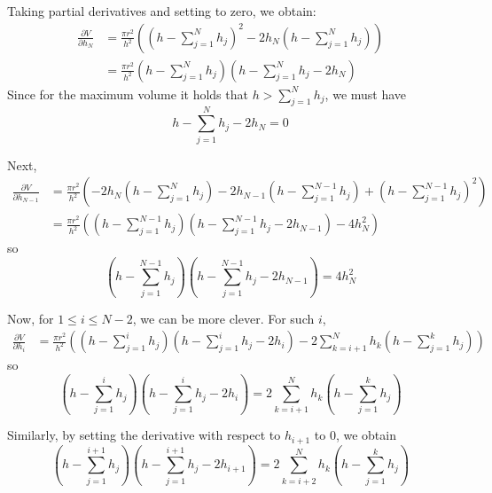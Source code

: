 \documentclass[12pt]{article}
\begin{document}
Taking partial derivatives and setting to zero, we obtain:
\begin{align*}
  \frac{\partial V}{\partial h_N} &= \frac{\pi r^2}{h^2} \left( \left( h - \sum_{j=1}^N h_j \right)^2 - 2h_N \left( h - \sum_{j=1}^N h_j \right) \right) \\
  &= \frac{\pi r^2}{h^2} \left( h - \sum_{j=1}^N h_j \right) \left( h - \sum_{j=1}^N h_j - 2h_N \right)
\end{align*}
Since for the maximum volume it holds that $h > \sum_{j=1}^N h_j$, we must have
\begin{equation}
  \label{eq:5}
  h - \sum_{j=1}^N h_j - 2h_N = 0
\end{equation}

Next,
\begin{align*}
  \frac{\partial V}{\partial h_{N-1}} &= \frac{\pi r^2}{h^2} \left( -2h_N\left(h - \sum_{j=1}^N h_j\right) - 2h_{N-1}\left( h - \sum_{j=1}^{N-1}h_j \right) + \left( h - \sum_{j=1}^{N-1}h_j \right)^2 \right) \\
  &= \frac{\pi r^2}{h^2}\left( \left( h - \sum_{j=1}^{N-1}h_j \right) \left( h - \sum_{j=1}^{N-1}h_j - 2h_{N-1} \right) - 4h_N^2 \right)
\end{align*}
so
\begin{equation}
  \label{eq:6}
  \left( h - \sum_{j=1}^{N-1}h_j \right) \left( h - \sum_{j=1}^{N-1}h_j - 2h_{N-1} \right) = 4h_N^2
\end{equation}

Now, for $1 \leq i \leq N - 2$, we can be more clever. For such $i$,
\begin{align*}
  \frac{\partial V}{\partial h_i} &= \frac{\pi r^2}{h^2} \left( \left( h - \sum_{j=1}^i h_j \right) \left( h - \sum_{j=1}^i h_j - 2h_i \right) - 2 \sum_{k=i+1}^N h_k \left( h - \sum_{j=1}^k h_j\right) \right)
\end{align*}
so
\begin{equation}
  \label{eq:7}
  \left( h - \sum_{j=1}^i h_j \right) \left( h - \sum_{j=1}^i h_j - 2h_i \right) = 2 \sum_{k=i+1}^N h_k \left( h - \sum_{j=1}^k h_j\right)
\end{equation}

Similarly, by setting the derivative with respect to $h_{i+1}$ to 0, we obtain
\begin{equation}
  \label{eq:8}
  \left( h - \sum_{j=1}^{i+1} h_j \right) \left( h - \sum_{j=1}^{i+1} h_j - 2h_{i+1} \right) = 2 \sum_{k=i+2}^N h_k \left( h - \sum_{j=1}^k h_j\right)
\end{equation}
\end{document}

